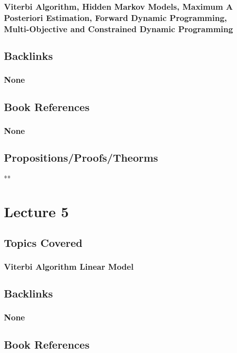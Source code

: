 \documentclass[11pt]{article}
\begin{document}
\subsubsection*{Viterbi Algorithm, Hidden Markov Models, Maximum A Posteriori Estimation, Forward Dynamic Programming, Multi-Objective and Constrained Dynamic Programming}
\label{sec:org4f27266}
\subsection*{Backlinks}
\label{sec:org4f49226}
\subsubsection*{None}
\label{sec:org89fd349}
\subsection*{Book References}
\label{sec:org6d2edeb}
\subsubsection*{None}
\label{sec:orgac6c5b1}
\subsection*{Propositions/Proofs/Theorms}
\label{sec:org5b57258}
**

\section*{Lecture 5}
\label{sec:org2674dfd}
\subsection*{Topics Covered}
\label{sec:org62e121e}
\subsubsection*{Viterbi Algorithm Linear Model}
\label{sec:orgbcb8d53}
\subsection*{Backlinks}
\label{sec:org5b15e49}
\subsubsection*{None}
\label{sec:org3c5ce2c}
\subsection*{Book References}
\label{sec:orgc30726d}
\end{document}
